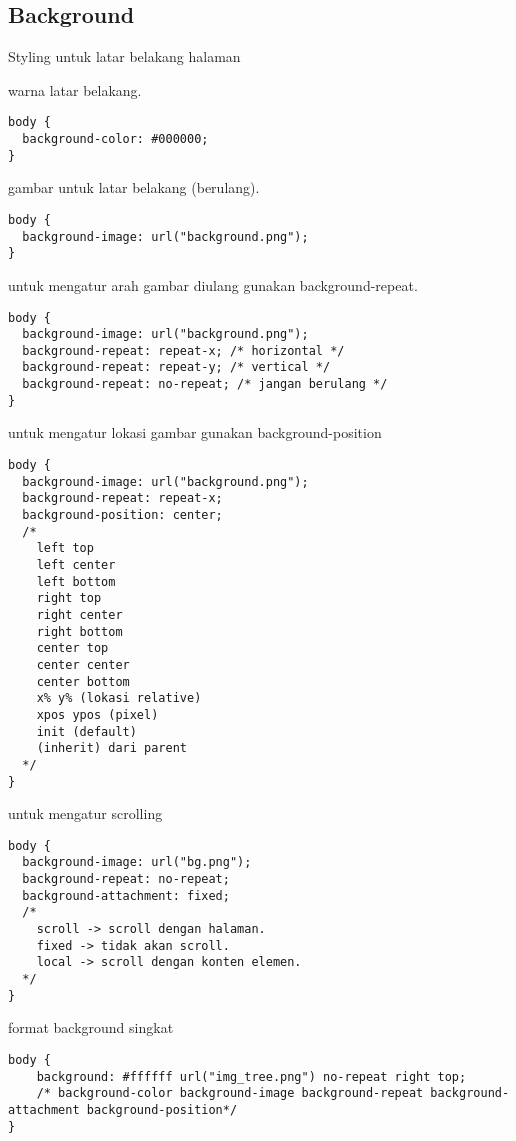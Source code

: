 \documentclass[12pt,a4paper]{article}
\begin{document}
\subsection*{Background}
Styling untuk latar belakang halaman

warna latar belakang.

\begin{lstlisting}
body {
  background-color: #000000;
}
\end{lstlisting}

gambar untuk latar belakang (berulang).

\begin{lstlisting}
body {
  background-image: url("background.png");
}
\end{lstlisting}

untuk mengatur arah gambar diulang gunakan background-repeat.

\begin{lstlisting}
body {
  background-image: url("background.png");
  background-repeat: repeat-x; /* horizontal */
  background-repeat: repeat-y; /* vertical */
  background-repeat: no-repeat; /* jangan berulang */
}

\end{lstlisting}

untuk mengatur lokasi gambar gunakan background-position

\begin{lstlisting}
body {
  background-image: url("background.png");
  background-repeat: repeat-x;
  background-position: center;
  /*
    left top
    left center
    left bottom
    right top
    right center
    right bottom
    center top
    center center
    center bottom
    x% y% (lokasi relative)
    xpos ypos (pixel)
    init (default)
    (inherit) dari parent
  */
}

\end{lstlisting}

untuk mengatur scrolling

\begin{lstlisting}
body {
  background-image: url("bg.png");
  background-repeat: no-repeat;
  background-attachment: fixed;
  /*
    scroll -> scroll dengan halaman.
    fixed -> tidak akan scroll.
    local -> scroll dengan konten elemen.
  */
}

\end{lstlisting}

format background singkat

\begin{lstlisting}
body {
    background: #ffffff url("img_tree.png") no-repeat right top;
    /* background-color background-image background-repeat background-attachment background-position*/
}

\end{lstlisting}
\end{document}
